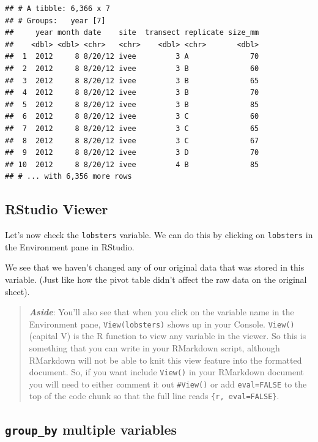 \documentclass[]{book}
\begin{document}
\begin{verbatim}
## # A tibble: 6,366 x 7
## # Groups:   year [7]
##     year month date    site  transect replicate size_mm
##    <dbl> <dbl> <chr>   <chr>    <dbl> <chr>       <dbl>
##  1  2012     8 8/20/12 ivee         3 A              70
##  2  2012     8 8/20/12 ivee         3 B              60
##  3  2012     8 8/20/12 ivee         3 B              65
##  4  2012     8 8/20/12 ivee         3 B              70
##  5  2012     8 8/20/12 ivee         3 B              85
##  6  2012     8 8/20/12 ivee         3 C              60
##  7  2012     8 8/20/12 ivee         3 C              65
##  8  2012     8 8/20/12 ivee         3 C              67
##  9  2012     8 8/20/12 ivee         3 D              70
## 10  2012     8 8/20/12 ivee         4 B              85
## # ... with 6,356 more rows
\end{verbatim}

\hypertarget{rstudio-viewer}{%
\subsection{RStudio Viewer}\label{rstudio-viewer}}

Let's now check the \texttt{lobsters} variable. We can do this by clicking on \texttt{lobsters} in the Environment pane in RStudio.

We see that we haven't changed any of our original data that was stored in this variable. (Just like how the pivot table didn't affect the raw data on the original sheet).

\begin{quote}
\textbf{\emph{Aside}}: You'll also see that when you click on the variable name in the Environment pane, \texttt{View(lobsters)} shows up in your Console. \texttt{View()} (capital V) is the R function to view any variable in the viewer. So this is something that you can write in your RMarkdown script, although RMarkdown will not be able to knit this view feature into the formatted document. So, if you want include \texttt{View()} in your RMarkdown document you will need to either comment it out \texttt{\#View()} or add \texttt{eval=FALSE} to the top of the code chunk so that the full line reads \texttt{\{r,\ eval=FALSE\}}.
\end{quote}

\hypertarget{group_by-multiple-variables}{%
\subsection{\texorpdfstring{\texttt{group\_by} multiple variables}{group\_by multiple variables}}\label{group_by-multiple-variables}}
\end{document}
